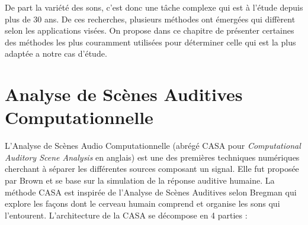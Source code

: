De part la variété des sons, c'est donc une tâche complexe qui est à l'étude depuis plus de 30 ans. De ces recherches, plusieurs méthodes ont émergées qui diffèrent selon les applications visées. On propose dans ce chapitre de présenter certaines des méthodes les plus couramment utilisées pour déterminer celle qui est la plus adaptée a notre cas d'étude.

\section{Analyse de Scènes Auditives Computationnelle}

L'Analyse de Scènes Audio Computationnelle (abrégé CASA pour \textit{Computational Auditory Scene Analysis} en anglais) est une des premières techniques numériques cherchant à séparer les différentes sources composant un signal. Elle fut proposée par Brown \cite{brown1994computational} et se base sur la simulation de la réponse auditive humaine.
La méthode CASA est inspirée de l'Analyse de Scènes Auditives selon Bregman \cite{bregman1994auditory} qui explore les façons dont le cerveau humain comprend et organise les sons qui l'entourent. L'architecture de la CASA se décompose en 4 parties \cite{wang2006computational} :

